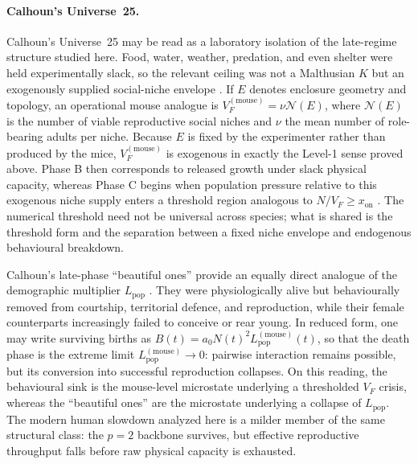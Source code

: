 \documentclass[11pt]{article}
\begin{document}
\paragraph{Calhoun's Universe~25.}
Calhoun's Universe~25 may be read as a laboratory isolation of the late-regime structure
studied here.
Food, water, weather, predation, and even shelter were held experimentally slack, so the
relevant ceiling was not a Malthusian $K$ but an exogenously supplied social-niche envelope
\cite{calhoun1973,calhoun1963}.
If $E$ denotes enclosure geometry and topology, an operational mouse analogue is
$V_F^{(\mathrm{mouse})}=\nu\mathcal{N}(E)$, where $\mathcal{N}(E)$ is the number of viable
reproductive social niches and $\nu$ the mean number of role-bearing adults per niche.
Because $E$ is fixed by the experimenter rather than produced by the mice,
$V_F^{(\mathrm{mouse})}$ is exogenous in exactly the Level-1 sense proved above.
Phase B then corresponds to released growth under slack physical capacity, whereas Phase C
begins when population pressure relative to this exogenous niche supply enters a threshold
region analogous to $N/V_F\ge x_{\mathrm{on}}$ \cite{calhoun1973}.
The numerical threshold need not be universal across species; what is shared is the threshold
form and the separation between a fixed niche envelope and endogenous behavioural breakdown.

Calhoun's late-phase ``beautiful ones'' provide an equally direct analogue of the demographic
multiplier $L_{\mathrm{pop}}$ \cite{calhoun1973,calhoun1977}.
They were physiologically alive but behaviourally removed from courtship, territorial defence,
and reproduction, while their female counterparts increasingly failed to conceive or rear young.
In reduced form, one may write surviving births as
$B(t)=a_0N(t)^2L_{\mathrm{pop}}^{(\mathrm{mouse})}(t)$, so that the death phase is the
extreme limit $L_{\mathrm{pop}}^{(\mathrm{mouse})}\to 0$: pairwise interaction remains
possible, but its conversion into successful reproduction collapses.
On this reading, the behavioural sink is the mouse-level microstate underlying a thresholded
$V_F$ crisis, whereas the ``beautiful ones'' are the microstate underlying a collapse of
$L_{\mathrm{pop}}$.
The modern human slowdown analyzed here is a milder member of the same structural class: the
$p=2$ backbone survives, but effective reproductive throughput falls before raw physical
capacity is exhausted.
\end{document}
